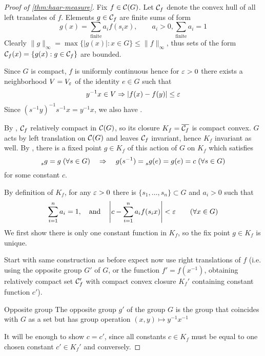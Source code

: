 \begin{proof}[Proof of \cref{thm:haar-measure}]
  Fix $f \in \mathcal{C}(G)$. Let $\mathcal{C}_f$ denote the convex hull of all left
  translates of $f$. Elements $g \in \mathcal{C}_f$ are finite sums of form
  \[
    g(x) = \sum_{\mathrm{finite}} a_i f(s_i x), \qquad a_i > 0, \sum_{\mathrm{finite}} a_i = 1
  \]
  Clearly $\|g\|_\infty = \max\{\lvert g(x)\rvert : x \in G\} \leq \|f\|_\infty$, thus
  sets of the form $\mathcal{C}_f(x) = \{g(x) : g \in \mathcal{C}_f\}$ are bounded.

  Since $G$ is compact, $f$ is uniformly continuous hence for $\varepsilon > 0$
  there exists a neighborhood $V = V_\varepsilon$ of the identity $e \in G$ such that
  \[
    y^{-1} x \in V \Rightarrow \lvert f(x) - f(y) \rvert \leq \varepsilon
  \]
  Since $(s^{-1} y)^{-1} s^{-1} x = y^{-1} x$, we also have \todo{}.

  By ,
  $\mathcal{C}_f$ relatively compact in $\mathcal{C}(G)$, so its
  closure $K_f = \overline{\mathcal{C}_f}$ is compact convex.
  $G$ acts by left translation on $\mathcal{C}(G)$ and leaves $\mathcal{C}_f$ invariant,
  hence $K_f$ invariant as well. By , there is a fixed
  point $g \in K_f$ of this action of $G$ on $K_f$ which satisfies
  \[
    \prescript{}{s}{g} = g \; (\forall s \in G)
    \quad\Rightarrow\quad
    g(s^{-1}) = \prescript{}{s}g(e) = g(e) = c\; (\forall s \in G)
  \]
  for some constant $c$.

  By definition of $K_f$, for any $\varepsilon > 0$ there is
  $\{s_1, \ldots, s_n\} \subset G$ and $a_i > 0$ such that
  \[
    \sum_{i=1}^n a_i = 1,
    \quad \text{and}\quad \left\lvert c - \sum_{i=1}^n a_i f(s_i x) \right\rvert < \varepsilon
    \qquad (\forall x \in G)
  \]
  We first show there is only one constant function in $K_f$, so the fix
  point $g \in K_f$ is unique.

  Start with same construction as before expect now use right translations of
  $f$ (i.e. using the opposite group $G'$ of $G$, or the function $f' =
  f(x^{-1})$, obtaining relatively compact set $\mathcal{C}_f'$ with compact convex
  closure $K_f'$ containing constant function $c'$).

  \begin{note}{Opposite group}
    The opposite group $g'$ of the group $G$ is the group that
    coincides with $G$ as a set but has group operation
    $(x,y) \mapsto y^{-1} x^{-1}$
  \end{note}
  It will be enough to show $c=c'$, since all constants $c \in K_f$ must be
  equal to one chosen constant $c' \in K_f'$ and conversely.


\end{proof}
